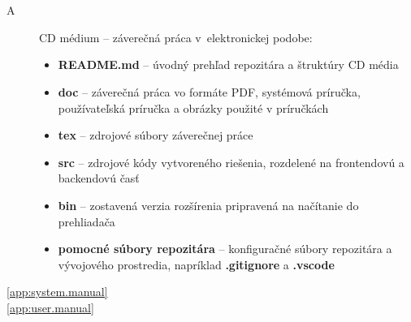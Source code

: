 \chapter*{\appendixlistname}

\begin{description}

   \item[\appendixname{} A] CD médium -- záverečná práca v~elektronickej podobe:
   \begin{itemize}
      \item \textbf{README.md} -- úvodný prehľad repozitára a štruktúry CD média
      \item \textbf{doc} -- záverečná práca vo formáte PDF, systémová príručka, používateľská príručka a obrázky použité v príručkách
      \item \textbf{tex} -- zdrojové súbory záverečnej práce
      \item \textbf{src} -- zdrojové kódy vytvoreného riešenia, rozdelené na frontendovú a backendovú časť
      \item \textbf{bin} -- zostavená verzia rozšírenia pripravená na načítanie do prehliadača
      \item \textbf{pomocné súbory repozitára} -- konfiguračné súbory repozitára a vývojového prostredia, napríklad \textbf{.gitignore} a \textbf{.vscode}
   \end{itemize}

   \item[\autoref{app:system.manual}] 
   \item[\autoref{app:user.manual}] 

\end{description}